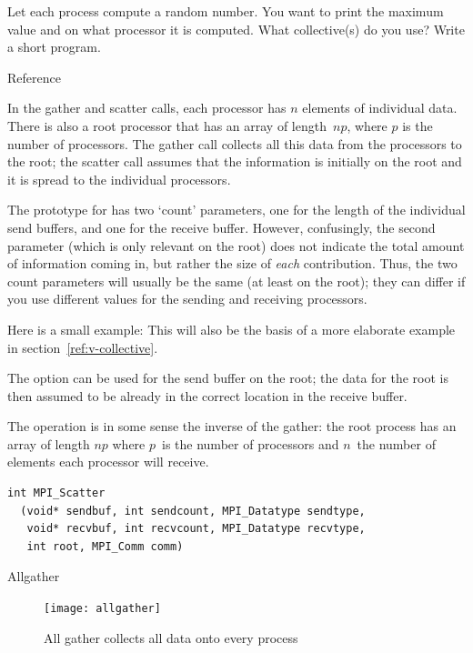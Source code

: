 \begin{exercise}
  \label{ex:randomwhere}
  Let each process compute a random number.
  You want to print the maximum value and on what processor it
  is computed. What collective(s) do you use? Write a short program.
\end{exercise}

 {Reference}

In the gather and scatter calls, each processor has $n$ elements of individual
data. There is also a root processor that has an array of length~$np$, where $p$
is the number of processors. The gather call collects all this data from the 
processors to the root; the scatter call assumes that the information is 
initially on the root and it is spread to the individual processors.

The prototype for  has two `count' parameters, one
for the length of the individual send buffers, and one for the receive buffer.
However, confusingly, the second parameter (which is only relevant on the root)
does not indicate the total amount of information coming in, but
rather the size of \emph{each} contribution. Thus, the two count parameters
will usually be the same (at least on the root); they can differ if you 
use different  values for the sending and receiving
processors.


Here is a small example:
This will also be the basis of a more elaborate example in
section~\ref{ref:v-collective}.

The  option can be used for the send buffer on the root;
the data for the root is then assumed to be already in the correct location
in the receive buffer.

The  operation is in some sense the inverse of the gather:
the root process has an array of length $np$ where $p$~is the number of processors
and $n$~the number of elements each processor will receive.
\begin{lstlisting}
int MPI_Scatter
  (void* sendbuf, int sendcount, MPI_Datatype sendtype, 
   void* recvbuf, int recvcount, MPI_Datatype recvtype, 
   int root, MPI_Comm comm) 
\end{lstlisting}

 {Allgather}

\begin{figure}[ht]
  \texttt{[image: allgather]}
  \caption{All gather collects all data onto every process}
  \label{fig:allgather}
\end{figure}

